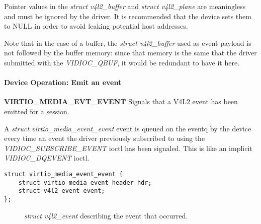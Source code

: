 Pointer values in the \textit{struct v4l2_buffer} and \textit{struct v4l2_plane}
are meaningless and must be ignored by the driver. It is recommended that the
device sets them to NULL in order to avoid leaking potential host addresses.

Note that in the case of a  buffer, the \textit{struct v4l2_buffer}
used as event payload is not followed by the buffer memory: since that memory
is the same that the driver submitted with the \textit{VIDIOC_QBUF}, it would
be redundant to have it here.

\paragraph{Device Operation: Emit an event}
\label{sec:Device Types / Media Device / Device Operation / Emit an event}

\textbf{VIRTIO_MEDIA_EVT_EVENT} Signals that a V4L2 event has been emitted for a session.

A \textit{struct virtio_media_event_event} event is queued on the eventq by the
device every time an event the driver previously subscribed to using the
\textit{VIDIOC_SUBSCRIBE_EVENT} ioctl has been signaled. This is like an
implicit \textit{VIDIOC_DQEVENT} ioctl.

\begin{lstlisting}
struct virtio_media_event_event {
    struct virtio_media_event_header hdr;
    struct v4l2_event event;
};
\end{lstlisting}

\begin{description}
\item[] \textit{struct v4l2_event} describing the event that occurred.
\end{description}
